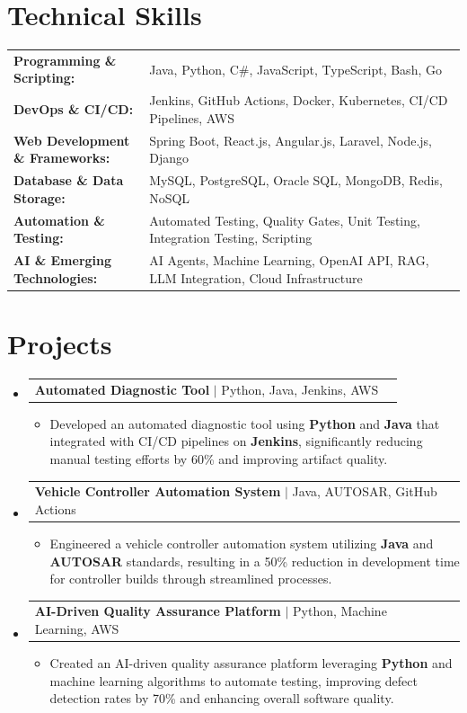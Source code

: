 \documentclass[letterpaper,10pt]{article}
\makeatletter
\newcommand{\resumeItem}[1]{
  \item{\fontsize{8pt}{9pt}\selectfont
    #1 \vspace{-3pt}
  }
}
\newcommand{\resumeProjectHeading}[2]{
    \item
    \begin{tabular*}{1.001\textwidth}{l@{\extracolsep{\fill}}r}
      \fontsize{8.5pt}{10pt}#1 & \textbf{\fontsize{8.5pt}{10pt} #2}\\
    \end{tabular*}\vspace{-7pt}
}
\newcommand{\resumeSubHeadingListStart}{\begin{itemize}[leftmargin=0pt, label={}]}
\newcommand{\resumeSubHeadingListEnd}{\end{itemize}}
\newcommand{\resumeItemListStart}{\begin{itemize}[leftmargin=*]}
\newcommand{\resumeItemListEnd}{\end{itemize}\vspace{-5pt}}
\makeatother
\begin{document}
\section{Technical Skills}
        \vspace{-14pt}
        \begin{table}[h]
            \fontsize{8pt}{9pt}\selectfont
            \begin{tabular}{p{0.3\linewidth} p{0.7\linewidth}}
                \textbf{Programming \& Scripting:} & Java, Python, C\#, JavaScript, TypeScript, Bash, Go \\
                \textbf{DevOps \& CI/CD:} & Jenkins, GitHub Actions, Docker, Kubernetes, CI/CD Pipelines, AWS \\
                \textbf{Web Development \& Frameworks:} & Spring Boot, React.js, Angular.js, Laravel, Node.js, Django \\
                \textbf{Database \& Data Storage:} & MySQL, PostgreSQL, Oracle SQL, MongoDB, Redis, NoSQL \\
                \textbf{Automation \& Testing:} & Automated Testing, Quality Gates, Unit Testing, Integration Testing, Scripting \\
                \textbf{AI \& Emerging Technologies:} & AI Agents, Machine Learning, OpenAI API, RAG, LLM Integration, Cloud Infrastructure \\
            \end{tabular}
        \end{table}
 \vspace{-18pt}

\section{Projects}
    \vspace{-5pt}
    \resumeSubHeadingListStart
          \resumeProjectHeading
            {\textbf{Automated Diagnostic Tool} $|$ Python, Java, Jenkins, AWS}{}
            \resumeItemListStart
                \resumeItem{Developed an automated diagnostic tool using \textbf{Python} and \textbf{Java} that integrated with CI/CD pipelines on \textbf{Jenkins}, significantly reducing manual testing efforts by 60\% and improving artifact quality.}
            \resumeItemListEnd
        \vspace{-12pt}
    
        \resumeProjectHeading
            {\textbf{Vehicle Controller Automation System} $|$ Java, AUTOSAR, GitHub Actions}{}
        \resumeItemListStart
                \resumeItem{Engineered a vehicle controller automation system utilizing \textbf{Java} and \textbf{AUTOSAR} standards, resulting in a 50\% reduction in development time for controller builds through streamlined processes.}
        \resumeItemListEnd
      \vspace{-12pt}
      \resumeProjectHeading
        {\textbf{AI-Driven Quality Assurance Platform} $|$ Python, Machine Learning, AWS}{}
    \resumeItemListStart
            \resumeItem{Created an AI-driven quality assurance platform leveraging \textbf{Python} and machine learning algorithms to automate testing, improving defect detection rates by 70\% and enhancing overall software quality.}
    \resumeItemListEnd
    \resumeSubHeadingListEnd
\end{document}
